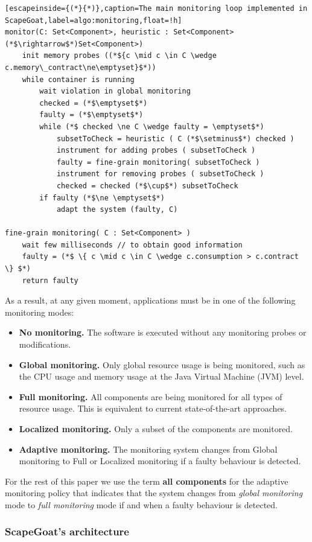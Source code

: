 \begin{lstlisting}[escapeinside={(*}{*)},caption=The main monitoring loop implemented in ScapeGoat,label=algo:monitoring,float=!h]
monitor(C: Set<Component>, heuristic : Set<Component>(*$\rightarrow$*)Set<Component>)
	init memory probes ((*${c \mid c \in C \wedge c.memory\_contract\ne\emptyset}$*))
	while container is running
		wait violation in global monitoring
		checked = (*$\emptyset$*)
		faulty = (*$\emptyset$*)
		while (*$ checked \ne C \wedge faulty = \emptyset$*)
			subsetToCheck = heuristic ( C (*$\setminus$*) checked )
			instrument for adding probes ( subsetToCheck )
			faulty = fine-grain monitoring( subsetToCheck )
			instrument for removing probes ( subsetToCheck )
			checked = checked (*$\cup$*) subsetToCheck
		if faulty (*$\ne \emptyset$*)
			adapt the system (faulty, C)

fine-grain monitoring( C : Set<Component> )
	wait few milliseconds // to obtain good information
	faulty = (*$ \{ c \mid c \in C \wedge c.consumption > c.contract \} $*)
	return faulty
\end{lstlisting}


As a result, at any given moment, applications must be in one of the following monitoring modes:
\begin{itemize}
\leftskip -.2in
	\item \textbf{No monitoring.} The software is executed without any monitoring probes or modifications.
	\item \textbf{Global monitoring.} Only global resource usage is being monitored, such as the CPU usage and memory usage at the Java Virtual Machine (JVM) level.
	\item \textbf{Full monitoring.} All components are being monitored for all types of resource usage. This is equivalent to current state-of-the-art approaches.
	\item \textbf{Localized monitoring.} Only a subset of the components are monitored.
	\item \textbf{Adaptive monitoring.} The monitoring system changes from Global monitoring to Full or Localized monitoring if a faulty behaviour is detected.
\end{itemize}
For the rest of this paper we use the term \textbf{all components} for the adaptive monitoring policy that indicates that the system changes from \emph{global monitoring} mode to \emph{full monitoring} mode if and when a faulty behaviour is detected.

\subsubsection{ScapeGoat's architecture}

